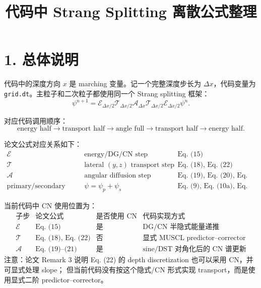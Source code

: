 \documentclass[11pt,a4paper]{ctexart}
\title{代码中 Strang Splitting 离散公式整理}
\author{}
\date{}
\begin{document}
\maketitle

\section*{1. 总体说明}

代码中的深度方向 \(x\) 是 marching 变量。记一个完整深度步长为
\(\Delta x\)，代码变量为 \texttt{grid.dt}。主粒子和二次粒子都使用同一个
Strang splitting 框架：
\begin{equation}
  \boxed{
  \psi^{n+1}
  =
  \mathcal E_{\Delta x/2}
  \mathcal T_{\Delta x/2}
  \mathcal A_{\Delta x}
  \mathcal T_{\Delta x/2}
  \mathcal E_{\Delta x/2}
  \psi^n
  }.
\end{equation}

对应代码调用顺序：
\begin{equation}
  \text{energy half}
  \rightarrow
  \text{transport half}
  \rightarrow
  \text{angle full}
  \rightarrow
  \text{transport half}
  \rightarrow
  \text{energy half}.
\end{equation}

论文公式对应关系如下：
\begin{equation}
\begin{array}{lll}
\mathcal E & \text{energy/DG/CN step} & \text{Eq. (15)} \\
\mathcal T & \text{lateral }(y,z)\text{ transport step} & \text{Eq. (18), Eq. (22)} \\
\mathcal A & \text{angular diffusion step} & \text{Eq. (19), Eq. (20), Eq. (21)} \\
\text{primary/secondary split} & \psi=\psi_p+\psi_s & \text{Eq. (9), Eq. (10a), Eq. (10b)}
\end{array}
\end{equation}

当前代码中 CN 使用位置为：
\begin{equation}
\begin{array}{llll}
\text{子步} & \text{论文公式} & \text{是否使用 CN} & \text{代码实现方式}\\
\hline
\mathcal E & \text{Eq. (15)} & \text{是} & \text{DG/CN 半隐式能量递推}\\
\mathcal T & \text{Eq. (18), Eq. (22)} & \text{否} & \text{显式 MUSCL predictor--corrector}\\
\mathcal A & \text{Eq. (19)--(21)} & \text{是} & \text{sine/DST 对角化后的 CN 谱更新}
\end{array}
\end{equation}
注意：论文 Remark 3 说明 Eq. (22) 的 depth discretization 也可以采用 CN，并可显式处理 slope；
但当前代码没有按这个隐式/CN 形式实现 transport，而是使用显式二阶 predictor--corrector。
\end{document}
